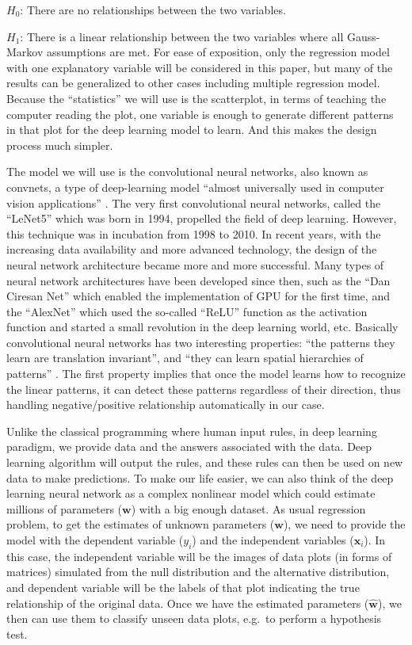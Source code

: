 \documentclass[12pt]{article}
\begin{document}
\(H_0\): There are no relationships between the two variables.

\(H_1\): There is a linear relationship between the two variables where
all Gauss-Markov assumptions are met. For ease of exposition, only the
regression model with one explanatory variable will be considered in
this paper, but many of the results can be generalized to other cases
including multiple regression model. Because the ``statistics'' we will
use is the scatterplot, in terms of teaching the computer reading the
plot, one variable is enough to generate different patterns in that plot
for the deep learning model to learn. And this makes the design process
much simpler.

The model we will use is the convolutional neural networks, also known
as convnets, a type of deep-learning model ``almost universally used in
computer vision applications'' \citep{DLR18}. The very first
convolutional neural networks, called the ``LeNet5'' which was born in
1994, propelled the field of deep learning. However, this technique was
in incubation from 1998 to 2010. In recent years, with the increasing
data availability and more advanced technology, the design of the neural
network architecture became more and more successful. Many types of
neural network architectures have been developed since then, such as the
``Dan Ciresan Net'' which enabled the implementation of GPU for the
first time, and the ``AlexNet'' which used the so-called ``ReLU''
function as the activation function and started a small revolution in
the deep learning world, etc. \citep{cnn2017} Basically convolutional
neural networks has two interesting properties: ``the patterns they
learn are translation invariant'', and ``they can learn spatial
hierarchies of patterns'' \citep{DLR18}. The first property implies that
once the model learns how to recognize the linear patterns, it can
detect these patterns regardless of their direction, thus handling
negative/positive relationship automatically in our case.

Unlike the classical programming where human input rules, in deep
learning paradigm, we provide data and the answers associated with the
data. Deep learning algorithm will output the rules, and these rules can
then be used on new data to make predictions. To make our life easier,
we can also think of the deep learning neural network as a complex
nonlinear model which could estimate millions of parameters
(\(\textbf{w}\)) with a big enough dataset. As usual regression problem,
to get the estimates of unknown parameters (\(\textbf{w}\)), we need to
provide the model with the dependent variable (\(y_i\)) and the
independent variables (\(\textbf{x}_i\)). In this case, the independent
variable will be the images of data plots (in forms of matrices)
simulated from the null distribution and the alternative distribution,
and dependent variable will be the labels of that plot indicating the
true relationship of the original data. Once we have the estimated
parameters (\(\hat{\textbf{w}}\)), we then can use them to classify
unseen data plots, e.g.~to perform a hypothesis test.
\end{document}
